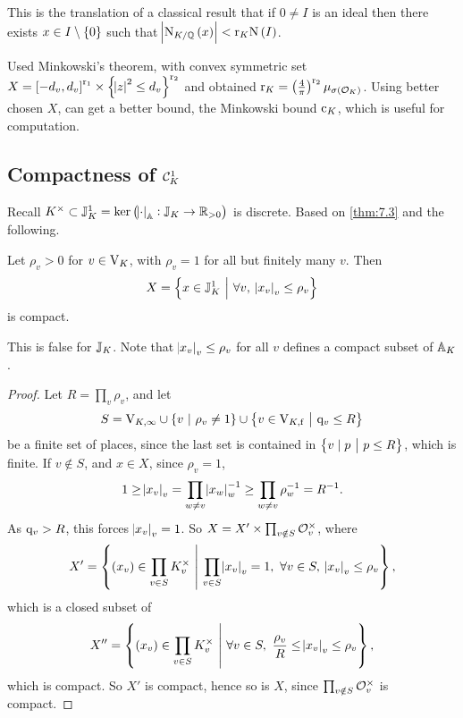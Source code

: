 This is the translation of a classical result that if $ 0 \ne I $ is an ideal then there exists $ x \in I \setminus \cbr{0} $ such that $ \abs{\N_{K / \QQ}\br{x}} < \r_K\N\br{I} $.


\begin{remark*}
Used Minkowski's theorem, with convex symmetric set $ X = \sbr{-d_v, d_v}^{\r_1} \times \cbr{\abs{z}^2 \le d_v}^{\r_2} $ and obtained $ \r_K = \br{\tfrac{4}{\pi}}^{\r_2}\mu_{\sigma\br{\OOO_K}} $. Using better chosen $ X $, can get a better bound, the Minkowski bound $ \c_K $, which is useful for computation.
\end{remark*}

\subsection{Compactness of \texorpdfstring{$ \CCC_K^1 $}{norm one idele class group}}

Recall $ K^\times \subset \JJ_K^1 = \ker \br{\abs{\cdot}_\AA : \JJ_K \to \RR_{> 0}} $ is discrete. Based on \ref{thm:7.3} and the following.

\begin{proposition}
\label{prop:7.5}
Let $ \rho_v > 0 $ for $ v \in \V_K $, with $ \rho_v = 1 $ for all but finitely many $ v $. Then
$$ X = \cbr{x \in \JJ_K^1 \st \forall v, \ \abs{x_v}_v \le \rho_v} $$
is compact.
\end{proposition}

This is false for $ \JJ_K $. Note that $ \abs{x_v}_v \le \rho_v $ for all $ v $ defines a compact subset of $ \AA_K $.

\begin{proof}
Let $ R = \prod_v \rho_v $, and let
$$ S = \V_{K, \infty} \cup \cbr{v \st \rho_v \ne 1} \cup \cbr{v \in \V_{K, \f} \st \q_v \le R} $$
be a finite set of places, since the last set is contained in $ \cbr{v \mid p \st p \le R} $, which is finite. If $ v \notin S $, and $ x \in X $, since $ \rho_v = 1 $,
$$ 1 \ge \abs{x_v}_v = \prod_{w \ne v} \abs{x_w}_w^{-1} \ge \prod_{w \ne v} \rho_w^{-1} = R^{-1}. $$
As $ \q_v > R $, this forces $ \abs{x_v}_v = 1 $. So $ X = X' \times \prod_{v \notin S} \OOO_v^\times $, where
$$ X' = \cbr{\br{x_v} \in \prod_{v \in S} K_v^\times \st \prod_{v \in S} \abs{x_v}_v = 1, \ \forall v \in S, \ \abs{x_v}_v \le \rho_v}, $$
which is a closed subset of
$$ X'' = \cbr{\br{x_v} \in \prod_{v \in S} K_v^\times \st \forall v \in S, \ \dfrac{\rho_v}{R} \le \abs{x_v}_v \le \rho_v}, $$
which is compact. So $ X' $ is compact, hence so is $ X $, since $ \prod_{v \notin S} \OOO_v^\times $ is compact.
\end{proof}

